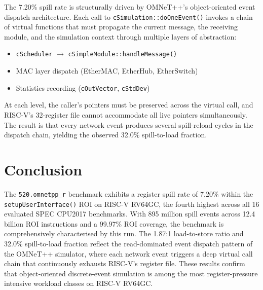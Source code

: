 \documentclass[conference]{IEEEtran}
\begin{document}
The 7.20\% spill rate is structurally driven by OMNeT++'s
object-oriented event dispatch architecture. Each call to
\texttt{cSimulation::doOneEvent()} invokes a chain of virtual
functions that must propagate the current message, the receiving
module, and the simulation context through multiple layers of
abstraction:
\begin{itemize}
    \item \texttt{cScheduler} $\rightarrow$ \texttt{cSimpleModule::handleMessage()}
    \item MAC layer dispatch (EtherMAC, EtherHub, EtherSwitch)
    \item Statistics recording (\texttt{cOutVector}, \texttt{cStdDev})
\end{itemize}
At each level, the caller's pointers must be preserved across the
virtual call, and RISC-V's 32-register file cannot accommodate all
live pointers simultaneously. The result is that every network event
produces several spill-reload cycles in the dispatch chain, yielding
the observed 32.0\% spill-to-load fraction.

\section{Conclusion}

The \texttt{520.omnetpp\_r} benchmark exhibits a register spill rate
of 7.20\% within the \texttt{setupUserInterface()} ROI on RISC-V
RV64GC, the fourth highest across all 16 evaluated SPEC CPU2017
benchmarks. With 895 million spill events across 12.4 billion ROI
instructions and a 99.97\% ROI coverage, the benchmark is
comprehensively characterised by this run. The 1.87:1 load-to-store
ratio and 32.0\% spill-to-load fraction reflect the read-dominated
event dispatch pattern of the OMNeT++ simulator, where each network
event triggers a deep virtual call chain that continuously exhausts
RISC-V's register file. These results confirm that object-oriented
discrete-event simulation is among the most register-pressure
intensive workload classes on RISC-V RV64GC.
\end{document}
